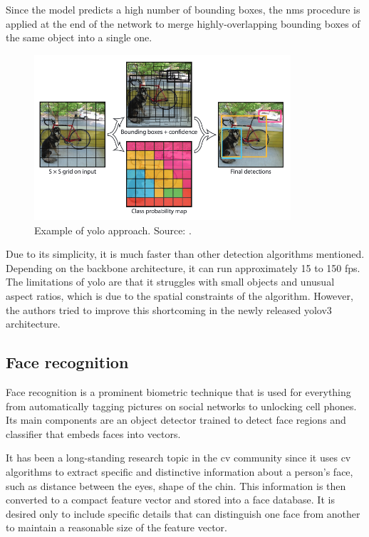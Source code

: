             Since the model predicts a high number of bounding boxes, the \gls{nms} \cite{rosebrocknms} procedure is applied at the end of the network to merge highly-overlapping bounding boxes of the same object into a single one.
            
             \begin{figure}[ht]
                \centering
                \includegraphics[width=0.85\textwidth]{resources/yolo_approach.png}
                \caption{Example of \gls{yolo} approach. Source: \cite{redmon2016you}.}
                \label{fig:yolo approach}
            \end{figure}
            
            Due to its simplicity, it is much faster than other detection algorithms mentioned. Depending on the backbone architecture, it can run approximately 15 to 150 \gls{fps}. The limitations of \gls{yolo} are that it struggles with small objects and unusual aspect ratios, which is due to the spatial constraints of the algorithm. However, the authors tried to improve this shortcoming in the newly released \gls{yolo}v3 architecture.

    \subsection{Face recognition}
        Face recognition is a prominent biometric technique that is used for everything from automatically tagging pictures on social networks to unlocking cell phones. Its main components are an object detector trained to detect face regions and classifier that embeds faces into vectors.
        
        It has been a long-standing research topic in the \gls{cv} community since it uses \gls{cv} algorithms to extract specific and distinctive information about a person's face, such as distance between the eyes, shape of the chin. This information is then converted to a compact feature vector and stored into a face database. It is desired only to include specific details that can distinguish one face from another to maintain a reasonable size of the feature vector. 
        
